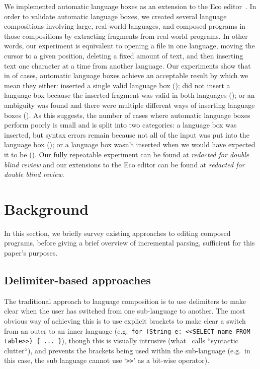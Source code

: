 \documentclass[sigplan,screen]{acmart}\settopmatter{printfolios=true,printccs=false,printacmref=false}
\begin{document}
We implemented automatic language boxes as an extension to the Eco
editor~\cite{diekmann14eco}. In order to validate automatic language boxes, we
created several language compositions involving large, real-world languages,
and composed programs in those compositions by extracting fragments from real-world programs.
In other words, our experiment is equivalent to opening a file
in one language, moving the cursor to a given position, deleting a fixed amount
of text, and then inserting text one character at a time from another language.
Our experiments show that in \validalloverall of cases, automatic language boxes achieve an
acceptable result by which we mean they either: inserted a single valid
language box (\breakdownallvalid); did not insert a language box because the
inserted fragment was valid in both languages (\breakdownallnovalid); or an ambiguity
was found and there were multiple different ways of inserting language boxes
(\breakdownallnomulti). As this suggests, the number of cases where automatic
language boxes perform poorly is small and is split into two categories: a
language box was inserted, but syntax errors remain because not all of the
input was put into the language box (\breakdownallinvalid); or a language box wasn't
inserted when we would have expected it to be (\breakdownallnoerror). Our fully
repeatable experiment can be found at \emph{redacted for double blind review}
and our extensions to the Eco editor can be found at \emph{redacted for double
blind review}.


\section{Background}
\label{sec_background}

In this section, we briefly survey existing approaches to editing composed
programs, before giving a brief overview of incremental parsing, sufficient for
this paper's purposes.


\subsection{Delimiter-based approaches}

The traditional approach to language composition is to use delimiters
to make clear when the user has switched from one sub-language to another. The
most obvious way of achieving this is to use explicit brackets to make clear a
switch from an outer to an inner language (e.g.~\texttt{for (String e: <<SELECT name
FROM table>>) \{ ... \}}), though this is visually intrusive
(what~\cite[p.~4]{bravenboer05generalized} calls ``syntactic clutter``), and
prevents the
brackets being used within the sub-language (e.g.~in this case, the sub language
cannot use `\texttt{>>}' as a bit-wise operator).
\end{document}
